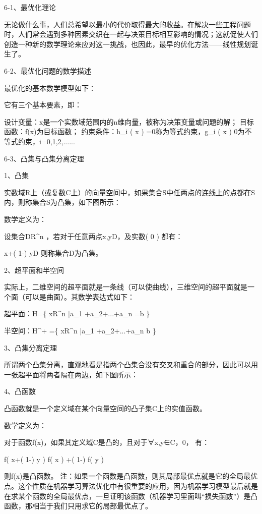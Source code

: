 \documentclass[11pt]{book}
\newcounter{#2}
\newcounter{#2}[#1]
\numberwithin{#2}{#1}
\begin{document}
6-1、最优化理论

无论做什么事，人们总希望以最小的代价取得最大的收益。在解决一些工程问题时，人们常会遇到多种因素交织在一起与决策目标相互影响的情况；这就促使人们创造一种新的数学理论来应对这一挑战，也因此，最早的优化方法——线性规划诞生了。 

6-2、最优化问题的数学描述

最优化的基本数学模型如下：

它有三个基本要素，即：

设计变量：x是一个实数域范围内的n维向量，被称为决策变量或问题的解；
目标函数：f(x)为目标函数；
约束条件：h_{i} \left( x \right) =0称为等式约束，g_{i} \left( x \right) \leq 0为不等式约束，i=0,1,2,......

6-3、凸集与凸集分离定理

1、凸集

实数域R上（或复数C上）的向量空间中，如果集合S中任两点的连线上的点都在S内，则称集合S为凸集，如下图所示：


数学定义为：

设集合D\subset R^{n} ，若对于任意两点x,y\in D，及实数\lambda \left( 0\leq \lambda {} \right) 都有：

\lambda x+\left( 1-\lambda  \right) y\in D
则称集合D为凸集。

2、超平面和半空间

实际上，二维空间的超平面就是一条线（可以使曲线），三维空间的超平面就是一个面（可以是曲面）。其数学表达式如下：

超平面：H=\left\{ x\in R^{n} |a_{1} +a_{2}+...+a_{n} =b  \right\} 

半空间：H^{+} =\left\{ x\in R^{n} |a_{1} +a_{2}+...+a_{n} \geq b  \right\} 

3、凸集分离定理

所谓两个凸集分离，直观地看是指两个凸集合没有交叉和重合的部分，因此可以用一张超平面将两者隔在两边，如下图所示：

4、凸函数

凸函数就是一个定义域在某个向量空间的凸子集C上的实值函数。


数学定义为：

对于函数f(x)，如果其定义域C是凸的，且对于∀x,y∈C，0\leq \alpha {}， 有： 

f\left( \theta x+\left( 1-\theta  \right) y \right) \leq \theta f\left( x \right) +\left( 1-\theta  \right) f\left( y \right) 

则f(x)是凸函数。
注：如果一个函数是凸函数，则其局部最优点就是它的全局最优点。这个性质在机器学习算法优化中有很重要的应用，因为机器学习模型最后就是在求某个函数的全局最优点，一旦证明该函数（机器学习里面叫“损失函数”）是凸函数，那相当于我们只用求它的局部最优点了。
\end{document}
